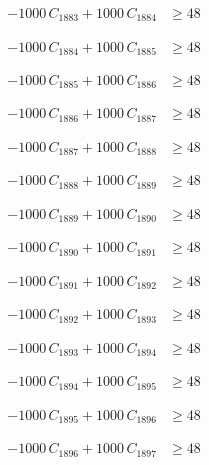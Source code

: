 \documentclass[a4paper,11pt]{article}
\begin{document}
\begin{align}
-1000\,C_{1883} + 1000\,C_{1884} &\geq 48 \nonumber
\end{align}

\begin{align}
-1000\,C_{1884} + 1000\,C_{1885} &\geq 48 \nonumber
\end{align}

\begin{align}
-1000\,C_{1885} + 1000\,C_{1886} &\geq 48 \nonumber
\end{align}

\begin{align}
-1000\,C_{1886} + 1000\,C_{1887} &\geq 48 \nonumber
\end{align}

\begin{align}
-1000\,C_{1887} + 1000\,C_{1888} &\geq 48 \nonumber
\end{align}

\begin{align}
-1000\,C_{1888} + 1000\,C_{1889} &\geq 48 \nonumber
\end{align}

\begin{align}
-1000\,C_{1889} + 1000\,C_{1890} &\geq 48 \nonumber
\end{align}

\begin{align}
-1000\,C_{1890} + 1000\,C_{1891} &\geq 48 \nonumber
\end{align}

\begin{align}
-1000\,C_{1891} + 1000\,C_{1892} &\geq 48 \nonumber
\end{align}

\begin{align}
-1000\,C_{1892} + 1000\,C_{1893} &\geq 48 \nonumber
\end{align}

\begin{align}
-1000\,C_{1893} + 1000\,C_{1894} &\geq 48 \nonumber
\end{align}

\begin{align}
-1000\,C_{1894} + 1000\,C_{1895} &\geq 48 \nonumber
\end{align}

\begin{align}
-1000\,C_{1895} + 1000\,C_{1896} &\geq 48 \nonumber
\end{align}

\begin{align}
-1000\,C_{1896} + 1000\,C_{1897} &\geq 48 \nonumber
\end{align}
\end{document}
